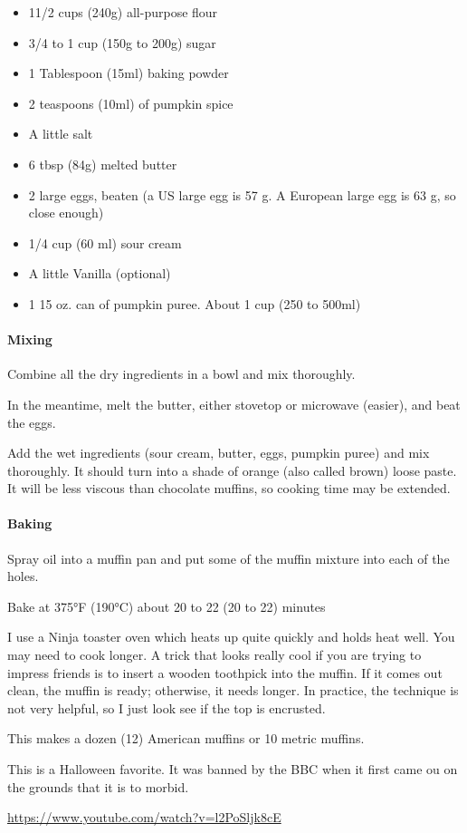 \begin{itemize}


\item 11/2 cups (240g) all-purpose flour

\item 3/4 to 1 cup (150g to 200g) sugar

\item 1 Tablespoon (15ml) baking powder

\item 2 teaspoons (10ml) of pumpkin spice

\item A little salt

\item 6 tbsp (84g) melted butter

\item 2 large eggs, beaten (a US large egg is 57 g. A European large egg is 63 g, so close enough)

\item 1/4 cup (60 ml) sour cream

\item A little Vanilla (optional)

\item 1 15 oz. can of pumpkin puree. About 1 cup (250 to 500ml)
\end{itemize}


\paragraph{Mixing}


Combine all the dry ingredients in a bowl and mix thoroughly.

In the meantime, melt the butter, either stovetop or microwave (easier), and beat the eggs.

Add the wet ingredients (sour cream, butter, eggs, pumpkin puree) and mix thoroughly. It should turn into a shade of orange (also called brown) loose paste. It will be less viscous than chocolate muffins, so cooking time may be extended.

\paragraph{Baking}


Spray oil into a muffin pan and put some of the muffin mixture into each of the holes.

Bake at 375°F (190°C) about 20 to 22 (20 to 22) minutes

I use a Ninja toaster oven which heats up quite quickly and holds heat well. You may need to cook longer. A trick that looks really cool if you are trying to impress friends is to insert a wooden toothpick into the muffin. If it comes out clean, the muffin is ready; otherwise, it needs longer. In practice, the technique is not very helpful, so I just look see if the top is encrusted.

This makes a dozen (12) American muffins or 10 metric muffins.

This is a Halloween favorite. It was banned by the BBC when it first came ou on the grounds that it is to morbid.

\url{https://www.youtube.com/watch?v=l2PoSljk8cE}


